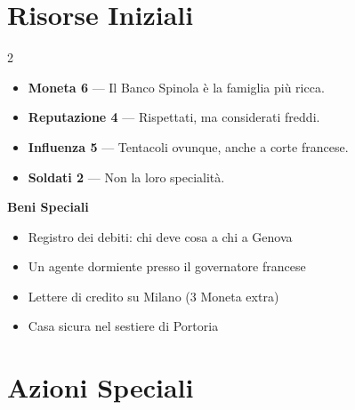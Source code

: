\section{Risorse Iniziali}


\begin{multicols}{2}
\begin{itemize}
  \item \textbf{Moneta 6} — Il Banco Spinola è la famiglia più ricca.
  \item \textbf{Reputazione 4} — Rispettati, ma considerati freddi.
  \item \textbf{Influenza 5} — Tentacoli ovunque, anche a corte francese.
  \item \textbf{Soldati 2} — Non la loro specialità.
\end{itemize}
\columnbreak
\textbf{Beni Speciali}
\begin{itemize}
  \item Registro dei debiti: chi deve cosa a chi a Genova
  \item Un agente dormiente presso il governatore francese
  \item Lettere di credito su Milano (3 Moneta extra)
  \item Casa sicura nel sestiere di Portoria
\end{itemize}
\end{multicols}

\section{Azioni Speciali}



